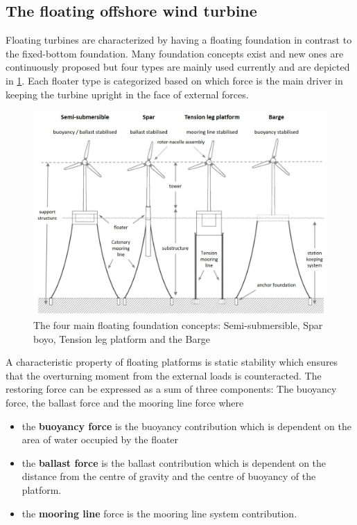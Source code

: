 \subsection{The floating offshore wind turbine} \label{sec:intro_theFOWT}
Floating turbines are characterized by having a floating foundation in contrast to the fixed-bottom foundation. Many foundation concepts exist and new ones are continuously proposed but four types are mainly used currently and are depicted in \cref{fig:floating_concepts}. Each floater type is categorized based on which force is the main driver in keeping the turbine upright in the face of external forces.
\begin{figure}[ht]
	\centering
	\includegraphics[width=1\linewidth]{Graphics/FloatingFoundationConcepts.jpg}
	\caption{The four main floating foundation concepts: Semi-submersible, Spar boyo, Tension leg platform and the Barge \cite{DNV-GL2018}}
	\label{fig:floating_concepts}
\end{figure}
A characteristic property of floating platforms is static stability which ensures that the overturning moment from the external loads is counteracted. The restoring force can be expressed as a sum of three components: The buoyancy force, the ballast force and the mooring line force where
\begin{itemize}
	\item the \textbf{buoyancy force} is the buoyancy contribution which is dependent on the area of water occupied by the floater
	\item the \textbf{ballast force} is the ballast contribution which is dependent on the distance from the centre of gravity and the centre of buoyancy of the platform.
	\item the \textbf{mooring line} force is the mooring line system contribution.
\end{itemize}
